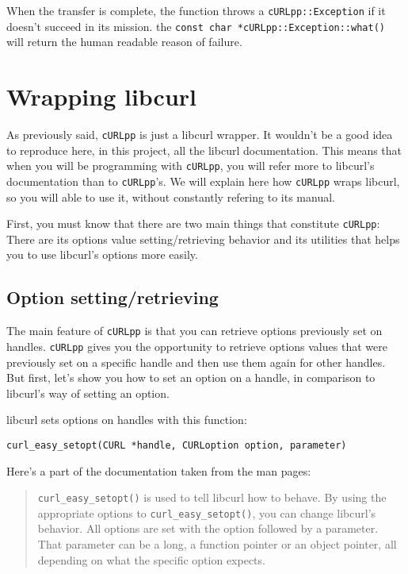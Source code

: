 \documentclass{article}
\begin{document}
When the transfer is complete, the function throws a 
\verb+cURLpp::Exception+ if it 
doesn't succeed in its mission. the \verb+const char *cURLpp::Exception::what()+ will
return the human readable reason of failure.

\section{Wrapping libcurl}

As previously said, \verb+cURLpp+ is just a \Cpp libcurl wrapper. It wouldn't be a good 
idea to reproduce here, in this project, all the libcurl documentation. This means 
that when you will be programming with \verb+cURLpp+, you will refer more to libcurl's 
documentation than to \verb+cURLpp+'s. We will explain here how \verb+cURLpp+ wraps libcurl, so
you will able to use it, without constantly refering to its manual. 

First, you must know that there are two main things that constitute \verb+cURLpp+: There are
its options value setting/retrieving behavior and its utilities that helps you to use
libcurl's options more easily. 

\subsection{Option setting/retrieving}

The main feature of \verb+cURLpp+ is that you can retrieve options previously set on handles.
\verb+cURLpp+ gives you the opportunity to retrieve options values that were previously set
on a specific handle and then use them again for other handles. But first, let's show
you how to set an option on a handle, in comparison to libcurl's way of setting an option.

libcurl sets options on handles with this function:

\begin{verbatim}
curl_easy_setopt(CURL *handle, CURLoption option, parameter)
\end{verbatim}

Here's a part of the documentation taken from the man pages:

\begin{quote}
\verb+curl_easy_setopt()+ is  used to tell libcurl how to behave. By using the appropriate options to 
\verb+curl_easy_setopt()+, you can change libcurl's behavior.  All options are set with the option 
followed by a parameter.  That  parameter can  be  a long, a function pointer or an object pointer, 
all depending on what the specific option expects.
\end{quote}
\end{document}

